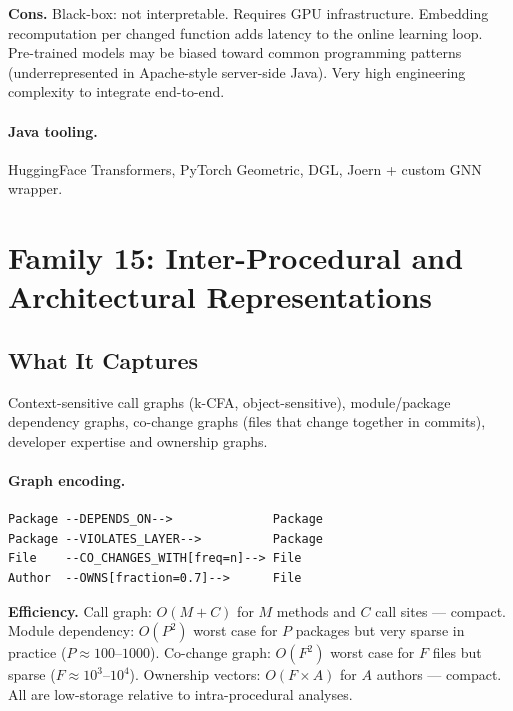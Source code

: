\documentclass[12pt,a4paper]{article}
\begin{document}
\begin{consbox}
\textbf{Cons.}
Black-box: not interpretable. Requires GPU infrastructure. Embedding
recomputation per changed function adds latency to the online learning loop.
Pre-trained models may be biased toward common programming patterns
(underrepresented in Apache-style server-side Java). Very high engineering
complexity to integrate end-to-end.
\end{consbox}

\paragraph{Java tooling.} HuggingFace Transformers, PyTorch Geometric, DGL,
Joern + custom GNN wrapper.

\section{Family 15: Inter-Procedural and Architectural Representations}

\subsection{What It Captures}

Context-sensitive call graphs (k-CFA, object-sensitive), module/package
dependency graphs, co-change graphs (files that change together in commits),
developer expertise and ownership graphs.

\paragraph{Graph encoding.}
\begin{lstlisting}
Package --DEPENDS_ON-->              Package
Package --VIOLATES_LAYER-->          Package
File    --CO_CHANGES_WITH[freq=n]--> File
Author  --OWNS[fraction=0.7]-->      File
\end{lstlisting}

\begin{effbox}
\textbf{Efficiency.}
Call graph: $O(M + C)$ for $M$ methods and $C$ call sites --- compact.
Module dependency: $O(P^2)$ worst case for $P$ packages but very sparse in
practice ($P \approx 100$--$1000$). Co-change graph: $O(F^2)$ worst case for
$F$ files but sparse ($F \approx 10^3$--$10^4$). Ownership vectors: $O(F
\times A)$ for $A$ authors --- compact. All are low-storage relative to
intra-procedural analyses.
\end{effbox}
\end{document}
